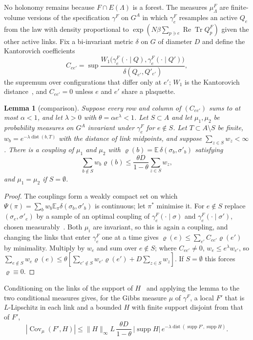 \documentclass[11pt]{amsart}
\newtheorem{lemma}[theorem]{Lemma}
\theoremstyle{definition}
\theoremstyle{remark}
\numberwithin{equation}{section}
\newcommand{\E}{\mathbb{E}}
\newcommand{\ReTr}{\operatorname{Re}\operatorname{Tr}}
\newcommand{\Cov}{\operatorname{Cov}}
\newcommand{\dist}{\operatorname{dist}}
\begin{document}
No holonomy remains because $F\cap E(\Lambda)$ is a forest. The measures
$\mu^F_\Lambda$ are finite-volume versions of the specification $\gamma^F$ on
$G^A$ in which $\gamma^F_e$ resamples an active $Q_e$ from the law with density
proportional to $\exp(N\beta\sum_{p\ni e}\ReTr Q^F_p)$ given the other active
links. Fix a bi-invariant metric $\delta$ on $G$ of diameter $D$ and define the
Kantorovich coefficients
\[
C_{ee'}=\sup\frac{W_1\bigl(\gamma^F_e(\cdot\mid Q),\gamma^F_e(\cdot\mid Q')\bigr)}
{\delta(Q_{e'},Q'_{e'})},
\]
the supremum over configurations that differ only at $e'$; $W_1$ is the
Kantorovich distance~\cite{Vil09}, and $C_{ee'}=0$ unless $e$ and $e'$ share a
plaquette.

\begin{lemma}[comparison]\label{lem:comparison}
Suppose every row and column of $(C_{ee'})$ sums to at most $\alpha<1$, and let
$\lambda>0$ with $\theta=\alpha e^\lambda<1$. Let $S\subset A$ and let $\mu_1,\mu_2$
be probability measures on $G^A$ invariant under $\gamma^F_e$ for $e\notin S$.
Let $T\subset A\setminus S$ be finite, $w_b=e^{-\lambda\dist(b,T)}$ with the
distance of link midpoints, and suppose $\sum_{z\in S}w_z<\infty$. There is a
coupling of $\mu_1$ and $\mu_2$ with $\varrho(b)=\E\,\delta(\sigma_b,\sigma'_b)$
satisfying
\[
\sum_{b\notin S}w_b\varrho(b)\le\frac{\theta D}{1-\theta}\sum_{z\in S}w_z ,
\]
and $\mu_1=\mu_2$ if $S=\emptyset$.
\end{lemma}

\begin{proof}
The couplings form a weakly compact set on which $\Psi(\pi)=\sum_bw_b\E_\pi
\delta(\sigma_b,\sigma'_b)$ is continuous; let $\pi^*$ minimise it. For $e\notin S$
replace $(\sigma_e,\sigma'_e)$ by a sample of an optimal coupling of
$\gamma^F_e(\cdot\mid\sigma)$ and $\gamma^F_e(\cdot\mid\sigma')$, chosen
measurably~\cite[Cor.~5.22]{Vil09}. Both $\mu_i$ are invariant, so this is again
a coupling, and changing the links that enter $\gamma^F_e$ one at a time gives
$\varrho(e)\le\sum_{e'}C_{ee'}\varrho(e')$ by minimality. Multiply by $w_e$ and sum
over $e\notin S$; where $C_{ee'}\ne0$, $w_e\le e^\lambda w_{e'}$, so
$\sum_{e\notin S}w_e\varrho(e)\le\theta[\sum_{e'\notin S}w_{e'}\varrho(e')+D\sum_{z
\in S}w_z]$. If $S=\emptyset$ this forces $\varrho\equiv0$.
\end{proof}

Conditioning on the links of the support of $H$~\cite[Ch.~3]{Kal21} and
applying the lemma to the two conditional measures gives, for the Gibbs
measure $\mu$ of $\gamma^F$, a local $F'$ that is $L$-Lipschitz in each link and
a bounded $H$ with finite support disjoint from that of $F'$,
\begin{equation}\label{eq:decay}
|\Cov_\mu(F',H)|\le\|H\|_\infty L\,\frac{\theta D}{1-\theta}\,|\operatorname{supp}H|\,
e^{-\lambda\dist(\operatorname{supp}F',\operatorname{supp}H)} .
\end{equation}
\end{document}
